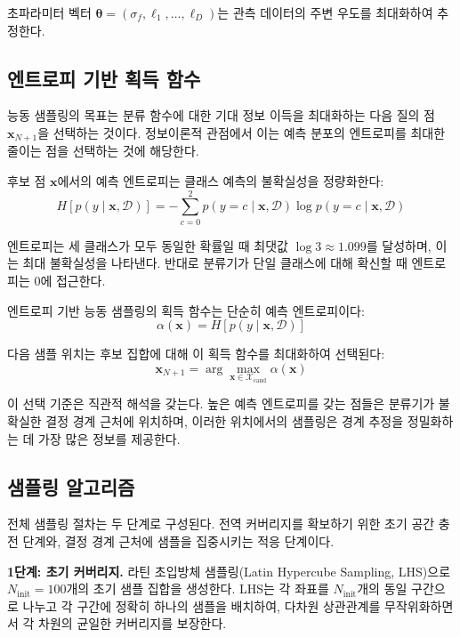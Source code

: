 \documentclass[a4paper,fleqn]{cas-dc}
\let\origsubsection\subsection
\renewcommand{\subsection}{\FloatBarrier\origsubsection}
\begin{document}
초파라미터 벡터 $\boldsymbol{\theta} = (\sigma_f, \ell_1, \ldots, \ell_D)$는 관측 데이터의 주변 우도를 최대화하여 추정한다.

\subsection{엔트로피 기반 획득 함수}

능동 샘플링의 목표는 분류 함수에 대한 기대 정보 이득을 최대화하는 다음 질의 점 $\mathbf{x}_{N+1}$을 선택하는 것이다. 정보이론적 관점에서 이는 예측 분포의 엔트로피를 최대한 줄이는 점을 선택하는 것에 해당한다.

후보 점 $\mathbf{x}$에서의 예측 엔트로피는 클래스 예측의 불확실성을 정량화한다:
\begin{equation}\label{eq:entropy}
H[p(y \mid \mathbf{x}, \mathcal{D})] = -\sum_{c=0}^{2} p(y = c \mid \mathbf{x}, \mathcal{D}) \log p(y = c \mid \mathbf{x}, \mathcal{D})
\end{equation}

엔트로피는 세 클래스가 모두 동일한 확률일 때 최댓값 $\log 3 \approx 1.099$를 달성하며, 이는 최대 불확실성을 나타낸다. 반대로 분류기가 단일 클래스에 대해 확신할 때 엔트로피는 0에 접근한다.

엔트로피 기반 능동 샘플링의 획득 함수는 단순히 예측 엔트로피이다:
\begin{equation}
\alpha(\mathbf{x}) = H[p(y \mid \mathbf{x}, \mathcal{D})]
\end{equation}

다음 샘플 위치는 후보 집합에 대해 이 획득 함수를 최대화하여 선택된다:
\begin{equation}
\mathbf{x}_{N+1} = \arg\max_{\mathbf{x} \in \mathcal{X}_{\text{cand}}} \alpha(\mathbf{x})
\end{equation}

이 선택 기준은 직관적 해석을 갖는다. 높은 예측 엔트로피를 갖는 점들은 분류기가 불확실한 결정 경계 근처에 위치하며, 이러한 위치에서의 샘플링은 경계 추정을 정밀화하는 데 가장 많은 정보를 제공한다.

\subsection{샘플링 알고리즘}

전체 샘플링 절차는 두 단계로 구성된다. 전역 커버리지를 확보하기 위한 초기 공간 충전 단계와, 결정 경계 근처에 샘플을 집중시키는 적응 단계이다.

\textbf{1단계: 초기 커버리지.} 라틴 초입방체 샘플링(Latin Hypercube Sampling, LHS)으로 $N_{\text{init}} = 100$개의 초기 샘플 집합을 생성한다. LHS는 각 좌표를 $N_{\text{init}}$개의 동일 구간으로 나누고 각 구간에 정확히 하나의 샘플을 배치하여, 다차원 상관관계를 무작위화하면서 각 차원의 균일한 커버리지를 보장한다.
\end{document}
